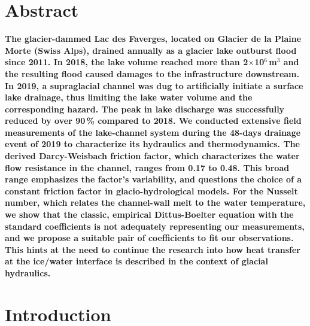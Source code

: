 \section{Abstract}

\textbf{The glacier-dammed Lac des Faverges, located on Glacier de la Plaine Morte (Swiss Alps), drained annually as a glacier lake outburst flood since 2011. In 2018, the lake volume reached more than 2$\times$10$^6$\,m$^3$ and the resulting flood caused damages to the infrastructure downstream. In 2019, a supraglacial channel was dug to artificially initiate a surface lake drainage, thus limiting the lake water volume and the corresponding hazard. The peak in lake discharge was successfully reduced by over 90\,\% compared to 2018. We conducted extensive field measurements of the lake-channel system during the 48-days drainage event of 2019 to characterize its hydraulics and thermodynamics. The derived Darcy-Weisbach friction factor, which characterizes the water flow resistance in the channel, ranges from 0.17 to 0.48. This broad range emphasizes the factor’s variability, and questions the choice of a constant friction factor in glacio-hydrological models. For the Nusselt number, which relates the channel-wall melt to the water temperature, we show that the classic, empirical Dittus-Boelter equation with the standard coefficients is not adequately representing our measurements, and we propose a suitable pair of coefficients to fit our observations. This hints at the need to continue the research into how heat transfer at the ice/water interface is described in the context of glacial hydraulics.}

\section{Introduction}

